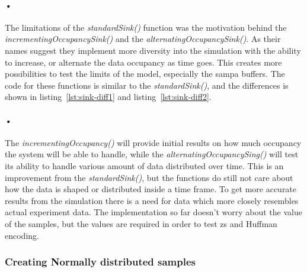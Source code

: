 \documentclass[a4paper, 12pt]{report}\dfrac{\right }{•}
\begin{document}
\begin{minipage}{\linewidth}

\end{minipage}

\paragraph{•}
The limitations of the \textit{standardSink()} function was the motivation behind the \textit{incrementingOccupancySink()} and the \textit{alternatingOccupancySink()}.
As their names suggest they implement more diversity into the simulation with the ability to increase, or alternate the data occupancy as time goes.
This creates more possibilities to test the limits of the model, especially the \gls{sampa} buffers.
The code for these functions is similar to the \textit{standardSink()}, and the differences is shown in listing~\ref{lst:sink-diff1} and listing~\ref{lst:sink-diff2}.

\begin{minipage}{\linewidth}


\end{minipage}

\paragraph{•} 
The \textit{incrementingOccupancy()} will provide initial results on how much occupancy the system will be able to handle, while the \textit{alternatingOccupancySing()} will test its ability to handle various amount of data distributed over time.
This is an improvement from the \textit{standardSink()}, but the functions do still not care about how the data is shaped or distributed inside a time frame.
To get more accurate results from the simulation there is a need for data which more closely resembles actual experiment data.
The implementation so far doesn't worry about the value of the samples, but the values are required in order to test \gls{zs} and Huffman encoding.

\subsubsection{Creating Normally distributed samples}
\label{subsubsec:normal-distribution}
\end{document}
